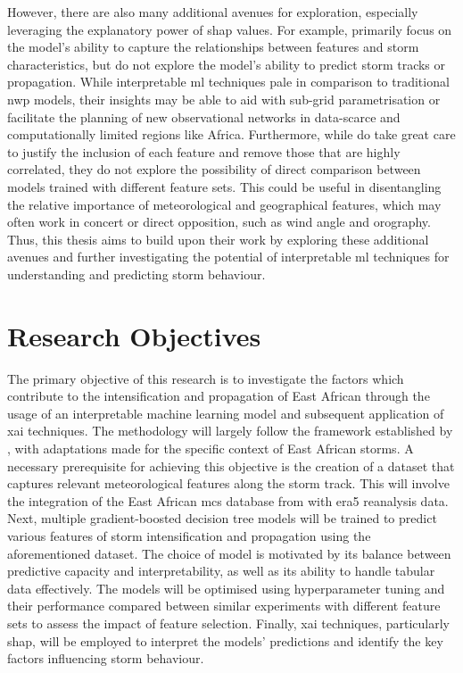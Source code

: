 However, there are also many additional avenues for exploration, especially leveraging the explanatory power of \acrshort{shap} values. For example, \cite{Hunt2024} primarily focus on the model's ability to capture the relationships between features and storm characteristics, but do not explore the model's ability to predict storm tracks or propagation. While interpretable \acrshort{ml} techniques pale in comparison to traditional \acrfull{nwp} models, their insights may be able to aid with sub-grid parametrisation or facilitate the planning of new observational networks in data-scarce and computationally limited regions like Africa. Furthermore, while \cite{Hunt2024} do take great care to justify the inclusion of each feature and remove those that are highly correlated, they do not explore the possibility of direct comparison between models trained with different feature sets. This could be useful in disentangling the relative importance of meteorological and geographical features, which may often work in concert or direct opposition, such as wind angle and orography. Thus, this thesis aims to build upon their work by exploring these additional avenues and further investigating the potential of interpretable \acrshort{ml} techniques for understanding and predicting storm behaviour.

\section{Research Objectives}

The primary objective of this research is to investigate the factors which contribute to the intensification and propagation of East African  through the usage of an interpretable machine learning model and subsequent application of \acrshort{xai} techniques. The methodology will largely follow the framework established by \cite{Hunt2024}, with adaptations made for the specific context of East African storms. A necessary prerequisite for achieving this objective is the creation of a dataset that captures relevant meteorological features along the storm track. This will involve the integration of the East African \acrshort{mcs} database from \cite{Hill2023} with \acrshort{era5} reanalysis data. Next, multiple gradient-boosted decision tree models will be trained to predict various features of storm intensification and propagation using the aforementioned dataset. The choice of model is motivated by its balance between predictive capacity and interpretability, as well as its ability to handle tabular data effectively. The models will be optimised using hyperparameter tuning and their performance compared between similar experiments with different feature sets to assess the impact of feature selection. Finally, \acrshort{xai} techniques, particularly \acrshort{shap}, will be employed to interpret the models' predictions and identify the key factors influencing storm behaviour.


